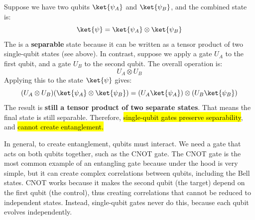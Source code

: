 \highspace
Suppose we have two qubits $\ket{\psi_A}$ and $\ket{\psi_B}$, and the combined state is:
\begin{equation*}
    \ket{\psi} = \ket{\psi_A} \otimes \ket{\psi_B}
\end{equation*}
The \ket{\psi} is a \textbf{separable} state because it can be written as a tensor product of two single-qubit states (see above). In contrast, suppose we apply a gate $U_A$ to the first qubit, and a gate $U_B$ to the second qubit. The overall operation is:
\begin{equation*}
    U_A \otimes U_B
\end{equation*}
Applying this to the state $\ket{\psi}$ gives:
\begin{equation*}
    (U_A \otimes U_B)(\ket{\psi_A} \otimes \ket{\psi_B}) = (U_A \ket{\psi_A}) \otimes (U_B \ket{\psi_B})
\end{equation*}
The result is \textbf{still a tensor product of two separate states}. That means the final state is still separable. Therefore, \hl{single-qubit gates preserve separability}, and \hl{cannot create entanglement.}

\highspace
In general, to create entanglement, qubits must interact. We need a gate that acts on both qubits together, such as the CNOT gate. The CNOT gate is the most common example of an entangling gate because under the hood is very simple, but it can create complex correlations between qubits, including the Bell states. CNOT works because it makes the second qubit (the target) depend on the first qubit (the control), thus creating correlations that cannot be reduced to independent states. Instead, single-qubit gates never do this, because each qubit evolves independently.

